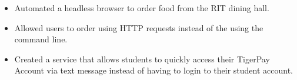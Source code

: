 \documentclass[10pt,a4paper,ragged2e,withhyper]{altacv}
\begin{document}
\begin{paracol}{2}
\begin{itemize}
    
    \end{itemize}

\smallskip \smallskip
  
      
    
  \newline
  \divider

    
    \begin{itemize}
    \item Automated a headless browser to order food from the RIT dining hall.
    \item Allowed users to order using HTTP requests instead of the using the command line.

    
    \end{itemize}

\smallskip \smallskip
  
      
     
  \newline
\divider

    
    \begin{itemize}
    
    \item Created a service that allows students to quickly access their TigerPay Account via text message instead of having to login to their student account.
    
    \end{itemize}

\smallskip \smallskip
  
     

\newline


\smallskip \smallskip
       
 

    
    \switchcolumn
    \smallskip
    

    

\end{paracol}
\end{document}
